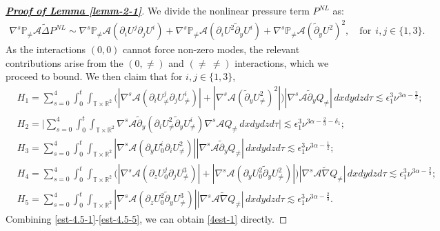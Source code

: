 \documentclass[11pt,reqno]{article}
\numberwithin{equation}{section}
\newcommand\R{{\mathbb R}}
\newcommand\T{{\mathbb T}}
\newcommand\PP{{\mathbb P}}
\newcommand\A{\mathcal{A}}
\let\pa=\partial
\let\al=\alpha
\let\f=\frac
\let\ep=\epsilon
\begin{document}
\begin{proof}[\underline{\textbf{Proof of Lemma \ref{lemm-2-1}}}]
We divide the nonlinear pressure term $P^{NL}$ as:
\begin{align*}
	\nabla^s\PP_{\not=}\A \widetilde{\Delta} P^{NL}
	\sim \nabla^s\PP_{\not=}\A (\pa_{i}U^j\pa_{j}U^i)
	+ \nabla^s\PP_{\not=}\A (\pa_{i}U^2\tilde{\pa}_yU^i)
	+\nabla^s\PP_{\not=}\A (\tilde{\pa}_yU^2)^2,
	\quad \text{for}~~i,j\in\{1,3\}.
\end{align*}
As the interactions $(0,0)$ cannot force non-zero modes, the relevant contributions arise from the $(0,\not=)$ and $(\not=\,\not=)$ interactions, which we proceed to bound.
We then claim that for $i,j\in\{1,3\}$,
\begin{align}
	&H_1=\sum_{s=0}^{4}
	\int_0^t\int_{\T\times\R^2}
	\big( |\nabla^s\A( \pa_{i}U^j_{\not=}\pa_{j}U^i_{\not=})| 
	+|\nabla^s\A (\tilde{\pa}_yU^2_{\not=})^2| 
	\big)
	|\nabla^s\A\tilde{\partial}_yQ_{\not=}|\,dxdydzd\tau
	\lesssim \ep_1^3\nu^{3\al-\f23};
	\label{est-4.5-1}
	\\
	&H_2=\Big|\sum_{s=0}^{4}
	\int_0^t\int_{\T\times\R^2}
	\nabla^s\A\tilde{\pa}_y(\pa_{i}U_{\not=}^2\tilde{\pa}_yU_{\not=}^i)
	\nabla^s\A Q_{\not=}\,dxdydzd\tau \Big|
	\lesssim \ep_1^3\nu^{3\al-\f23-\delta_1};
	\label{est-4.5-2}
	\\
	&H_3=\sum_{s=0}^{4}
	\int_0^t\int_{\T\times\R^2}
	|\nabla^s\A (\pa_yU^i_{0}\pa_{i}U_{\not=}^2)| 
|\nabla^s\A\tilde{\pa}_yQ_{\not=}|\,dxdydzd\tau
	\lesssim \ep_1^3\nu^{3\al-\f12};
	\label{est-4.5-3}
	\\
	&H_4=\sum_{s=0}^{4}
	\int_0^t\int_{\T\times\R^2}
	\big( |\nabla^s\A( \pa_{z}U^j_{0}\pa_{j}U^3_{\not=})| 
	+|\nabla^s\A (\pa_yU^2_{0}\tilde{\pa}_yU_{\not=}^2)| 
	\big)	|\nabla^s\A\widetilde{\nabla}Q_{\not=}|\,dxdydzd\tau
	\lesssim \ep_1^3\nu^{3\al-\f23};
	\label{est-4.5-4}
	\\
	&H_5=\sum_{s=0}^{4}
	\int_0^t\int_{\T\times\R^2}
	|\nabla^s\A( \pa_{z}U^2_{0}\tilde{\pa}_yU^3_{\not=})| 
	|\nabla^s\A\widetilde{\nabla}Q_{\not=}|\,dxdydzd\tau
	\lesssim \ep_1^3\nu^{3\al-\f23}.
	\label{est-4.5-5}
\end{align}
Combining \eqref{est-4.5-1}-\eqref{est-4.5-5}, we can obtain \eqref{4est-1} directly.


\end{proof}
\end{document}

